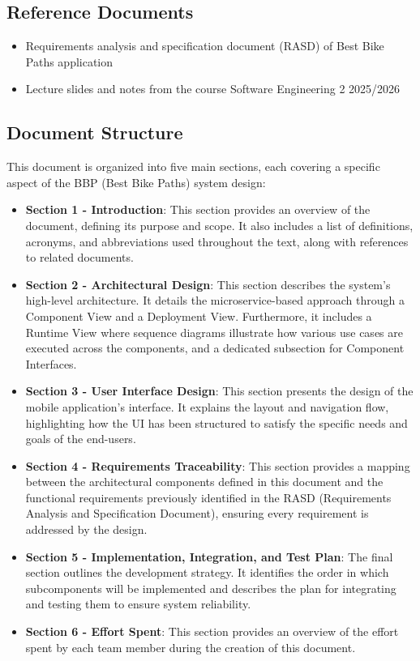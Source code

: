 \subsection{Reference Documents}

\begin{itemize}
   \item Requirements analysis and specification document (RASD) of Best Bike Paths application
   \item Lecture slides and notes from the course Software Engineering 2 2025/2026
\end{itemize}

\subsection{Document Structure}

This document is organized into five main sections, each covering a specific aspect of the BBP (Best Bike Paths) system design:

\begin{itemize}
    \item \textbf{Section 1 - Introduction}: This section provides an overview of the document, defining its purpose and scope. 
    It also includes a list of definitions, acronyms, and abbreviations used throughout the text, along with references to related documents.
    \item \textbf{Section 2 - Architectural Design}: This section describes the system's high-level architecture. It details the microservice-based approach through a Component View and a Deployment View. 
    Furthermore, it includes a Runtime View where sequence diagrams illustrate how various use cases are executed across the components, and a dedicated subsection for Component Interfaces.
    \item \textbf{Section 3 - User Interface Design}: This section presents the design of the mobile application's interface. 
    It explains the layout and navigation flow, highlighting how the UI has been structured to satisfy the specific needs and goals of the end-users.
    \item \textbf{Section 4 - Requirements Traceability}: This section provides a mapping between the architectural components defined in this document and the functional requirements previously identified in the RASD (Requirements Analysis and Specification Document), 
    ensuring every requirement is addressed by the design.
    \item \textbf{Section 5 - Implementation, Integration, and Test Plan}: The final section outlines the development strategy. It identifies the order in which subcomponents will be implemented and describes the plan for integrating and testing them to ensure system reliability.
    \item \textbf{Section 6 - Effort Spent}: This section provides an overview of the effort spent by each team member during the creation of this document.
\end{itemize}